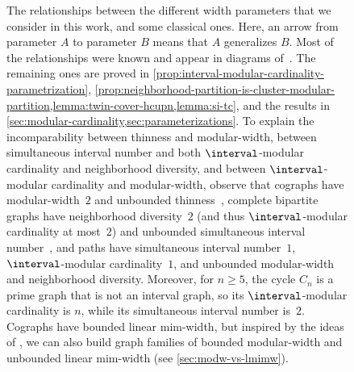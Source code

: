\documentclass[11pt]{article}
\theoremstyle{plain}
\theoremstyle{definition}
\theoremstyle{remark}
\begin{document}
\begin{figure}[ht]
\begin{center}
    \end{center}
    \caption{The relationships between the different width parameters that we consider in this work, and some classical ones. Here, an arrow from parameter $A$ to parameter $B$ means that $A$ generalizes $B$. Most of the relationships were known and appear in diagrams of~\citep{Milanic-sim,Belm-mw,B-B-M-P-convex-jcss,modular-width}. The remaining ones are proved in \cref{prop:interval-modular-cardinality-parametrization}, \cref{prop:neighborhood-partition-is-cluster-modular-partition,lemma:twin-cover-hcupn,lemma:si-tc}, and the results in \cref{sec:modular-cardinality,sec:parameterizations}.
    {To explain the incomparability between thinness and modular-width, between simultaneous interval number and both $\interval$-modular cardinality and neighborhood diversity, and between $\interval$-modular cardinality and modular-width, observe that cographs have modular-width~$2$ and unbounded thinness~\citep{tesis-diego}, complete bipartite graphs have neighborhood diversity~$2$ (and thus $\interval$-modular cardinality at most~$2$) and unbounded simultaneous interval number~\citep{Milanic-sim}, and paths have simultaneous interval number~$1$, $\interval$-modular cardinality~$1$, and unbounded modular-width and neighborhood diversity. Moreover, for $n \geq 5$, the cycle $C_n$ is a prime graph that is not an interval graph, so its $\interval$-modular cardinality is $n$, while its simultaneous interval number is~$2$.} Cographs have bounded linear mim-width, but inspired by the ideas of \citet{H-A-R-lin-mim-trees}, we can also build graph families of bounded modular-width and unbounded linear mim-width (see \cref{sec:modw-vs-lmimw}). %
    }\label{fig:diagram}
\end{figure}
\end{document}
